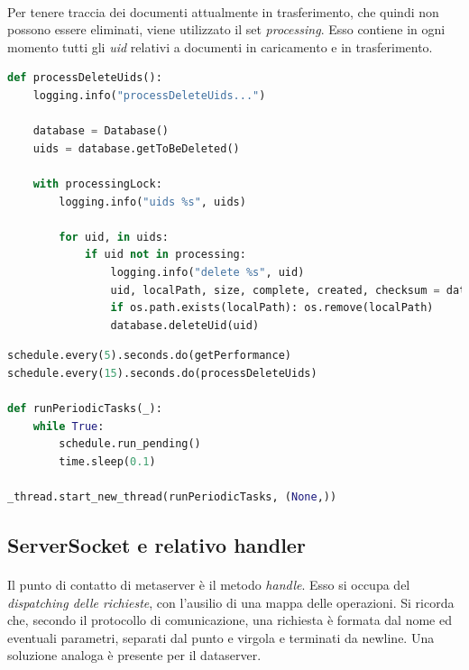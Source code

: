 \documentclass[11pt,a4paper,english]{article}
\begin{document}
\paragraph{} Per tenere traccia dei documenti attualmente in trasferimento, che quindi non possono essere eliminati, viene utilizzato il set \emph{processing}. Esso contiene in ogni momento tutti gli \emph{uid} relativi a documenti in caricamento e in trasferimento. 

\begin{lstlisting}[language=Python, title=Eliminazione dei documenti in coda]
def processDeleteUids():
    logging.info("processDeleteUids...")

    database = Database()
    uids = database.getToBeDeleted()

    with processingLock:
        logging.info("uids %s", uids)

        for uid, in uids:
            if uid not in processing:
                logging.info("delete %s", uid)
                uid, localPath, size, complete, created, checksum = database.getObject(uid)
                if os.path.exists(localPath): os.remove(localPath)
                database.deleteUid(uid)
\end{lstlisting}

\begin{lstlisting}[language=Python, title=Scheduling ed esecuzione]
schedule.every(5).seconds.do(getPerformance)
schedule.every(15).seconds.do(processDeleteUids)

def runPeriodicTasks(_):
    while True:
        schedule.run_pending()
        time.sleep(0.1)

_thread.start_new_thread(runPeriodicTasks, (None,))
\end{lstlisting}


\subsection{ServerSocket e relativo handler}

\paragraph{} Il punto di contatto di metaserver è il metodo \emph{handle}. Esso si occupa del \emph{dispatching delle richieste}, con l'ausilio di una mappa delle operazioni. Si ricorda che, secondo il protocollo di comunicazione, una richiesta è formata dal nome ed eventuali parametri, separati dal punto e virgola e terminati da newline. Una soluzione analoga è presente per il dataserver.
\end{document}
